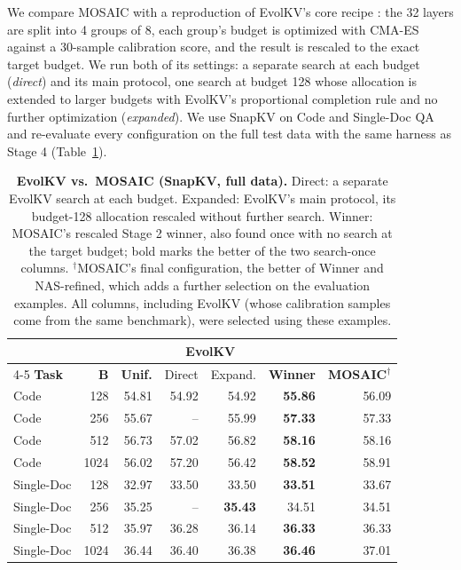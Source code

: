 \documentclass[11pt]{article}
\begin{document}
We compare MOSAIC with a reproduction of EvolKV's core recipe \citep{yu2025evolkv}: the 32 layers are split into 4 groups of 8, each group's budget is optimized with CMA-ES against a 30-sample calibration score, and the result is rescaled to the exact target budget. We run both of its settings: a separate search at each budget (\emph{direct}) and its main protocol, one search at budget 128 whose allocation is extended to larger budgets with EvolKV's proportional completion rule and no further optimization (\emph{expanded}). We use SnapKV on Code and Single-Doc QA and re-evaluate every configuration on the full test data with the same harness as Stage 4 (Table~\ref{tab:ablation}).

\begin{table}[t]
  \centering
  \footnotesize
  \setlength{\tabcolsep}{1.5pt}
  \begin{tabular}{@{} l r r r r r r @{}}
    \toprule
    & & & \multicolumn{2}{c}{\textbf{EvolKV}} & & \\
    \cmidrule(lr){4-5}
    \textbf{Task} & \textbf{B} & \textbf{Unif.} & Direct & Expand. & \textbf{Winner} & \textbf{MOSAIC}$^\dagger$ \\
    \midrule
    \rowcolor{gray!10}
    Code       & 128  & 54.81 & 54.92 & 54.92 & \textbf{55.86} & 56.09 \\
    Code       & 256  & 55.67 & --    & 55.99 & \textbf{57.33} & 57.33 \\
    \rowcolor{gray!10}
    Code       & 512  & 56.73 & 57.02 & 56.82 & \textbf{58.16} & 58.16 \\
    Code       & 1024 & 56.02 & 57.20 & 56.42 & \textbf{58.52} & 58.91 \\
    \rowcolor{gray!10}
    Single-Doc & 128  & 32.97 & 33.50 & 33.50 & \textbf{33.51} & 33.67 \\
    Single-Doc & 256  & 35.25 & --    & \textbf{35.43} & 34.51 & 34.51 \\
    \rowcolor{gray!10}
    Single-Doc & 512  & 35.97 & 36.28 & 36.14 & \textbf{36.33} & 36.33 \\
    Single-Doc & 1024 & 36.44 & 36.40 & 36.38 & \textbf{36.46} & 37.01 \\
    \bottomrule
  \end{tabular}
  \caption{\textbf{EvolKV vs.\ MOSAIC (SnapKV, full data).} Direct: a separate EvolKV search at each budget. Expanded: EvolKV's main protocol, its budget-128 allocation rescaled without further search. Winner: MOSAIC's rescaled Stage 2 winner, also found once with no search at the target budget; bold marks the better of the two search-once columns. $^\dagger$MOSAIC's final configuration, the better of Winner and NAS-refined, which adds a further selection on the evaluation examples. All columns, including EvolKV (whose calibration samples come from the same benchmark), were selected using these examples.}
  \label{tab:ablation}
\end{table}
\end{document}

